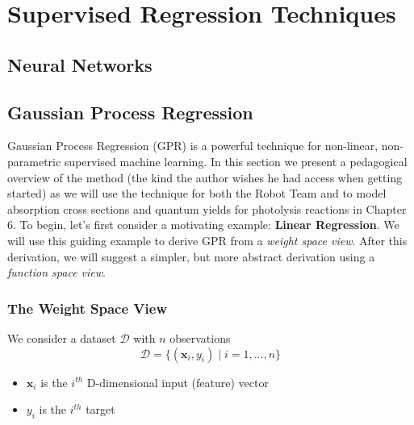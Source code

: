 
\section{Supervised Regression Techniques}
\subsection{Neural Networks}
\subsection{Gaussian Process Regression}


Gaussian Process Regression (GPR) is a powerful technique for non-linear, non-parametric supervised machine learning. In this section we present a pedagogical overview of the method (the kind the author wishes he had access when getting started) as we will use the technique for both the Robot Team and to model absorption cross sections and quantum yields for photolysis reactions in Chapter 6. To begin, let's first consider a motivating example: \textbf{Linear Regression}. We will use this guiding example to derive GPR from a \textit{weight space view}. After this derivation, we will suggest a simpler, but more abstract derivation using a \textit{function space view}. 

\subsubsection{The Weight Space View}

We consider a dataset $\mathcal{D}$ with $n$ observations
\begin{equation}
  \mathcal{D} = \Big\{ (\mathbf{x}_i, y_i) \;\Big\vert \; i = 1,...,n\Big\}
\end{equation}

\begin{itemize}[noitemsep, nolistsep]
\item $\mathbf{x}_i$ is the $i^{th}$ D-dimensional input (feature) vector
\item $y_i$ is the $i^{th}$ target
\end{itemize}


